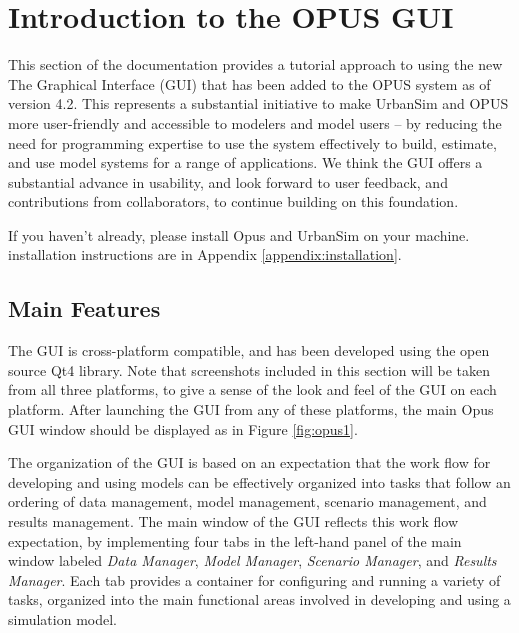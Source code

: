 \chapter{Introduction to the OPUS GUI}

This section of the documentation provides a tutorial approach to using the new The Graphical Interface (GUI) that has been added to the OPUS system as of version 4.2.  This represents a substantial initiative to make UrbanSim and OPUS more user-friendly and accessible to modelers and model users -- by reducing the need for programming expertise to use the system effectively to build, estimate, and use model systems for a range of applications.  We think the GUI offers a substantial advance in usability, and look forward to user feedback, and contributions from collaborators, to continue building on this foundation.

If you haven't already, please install Opus and UrbanSim on your machine.
installation instructions are in Appendix \ref{appendix:installation}.

\section{Main Features}

The GUI is cross-platform compatible, and has been developed using the open source Qt4 library.  Note that screenshots included in this section will be taken from all three platforms, to give a sense of the look and feel of the GUI on each platform.  After launching the GUI from any of these platforms, the main Opus GUI window should be displayed as in Figure \ref{fig:opus1}. 

The organization of the GUI is based on an expectation that the work flow for developing and using models can be effectively organized into tasks that follow an ordering of data management, model management, scenario management, and results management.  The main window of the GUI reflects this work flow expectation, by implementing four tabs in the left-hand panel of the main window labeled \emph{Data Manager}, \emph{Model Manager}, \emph{Scenario Manager}, and \emph{Results Manager}.  Each tab provides a container for configuring and running a variety of tasks, organized into the main functional areas involved in developing and using a simulation model.  

